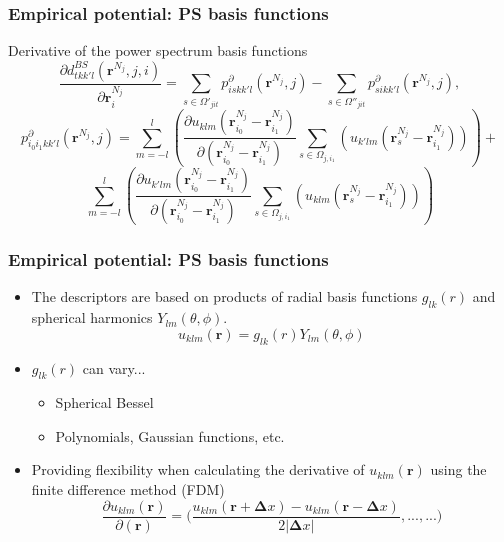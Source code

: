 \documentclass[10pt]{beamer}
\theoremstyle{remark}
\theoremstyle{definition}
\begin{document}
 


\begin{frame}
\frametitle{Empirical potential: PS basis functions}

Derivative of the power spectrum basis functions
\begin{equation*}
    \label{eq:derd}
    \frac{\partial d^{BS}_{tkk'l}(\bm r^{N_j}, j, i)}{\partial \bm r^{N_j}_i} = \sum_{s \in \Omega'_{jit}} p_{iskk'l}^{\partial}(\bm r^{N_j}, j) - \sum_{s \in \Omega''_{jit}} p_{sikk'l}^{\partial} ( \bm r^{N_j}, j),
\end{equation*}
\begin{equation*}
    p_{i_0i_1kk'l}^{\partial}(\bm r^{N_j}, j) = \sum_{m=-l}^l \left( \frac{\partial u_{klm}(\bm r_{i_0}^{N_j}- \bm r_{i_1}^{N_j})}{\partial (\bm r_{i_0}^{N_j}-\bm r_{i_1}^{N_j})} \sum_{s \in \Omega_{j,i_1}} \left( u_{k'lm} (\bm r^{N_j}_s- \bm r^{N_j}_{i_1}) \right) \right) + 
\end{equation*}
\begin{equation*}
\sum_{m=-l}^l \left( \frac{\partial u_{k'lm}(\bm r_{i_0}^{N_j}- \bm r_{i_1}^{N_j})}{\partial (\bm r_{i_0}^{N_j}- \bm r_{i_1}^{N_j})} \sum_{s \in \Omega_{j,i_1}} \left( u_{klm} (\bm r^{N_j}_s- \bm r^{N_j}_{i_1}) \right) \right)
\end{equation*}


\end{frame}
 
 

\begin{frame}
\frametitle{Empirical potential: PS basis functions}

\begin{itemize}
\item The descriptors are based on products of radial basis functions $g_{lk}(r)$ and spherical harmonics $Y_{lm}(\theta,\phi)$.
\begin{equation*}
u_{klm}(\bm r) =  g_{lk}(r) Y_{lm}(\theta,\phi)
\end{equation*}
\pause
\item $g_{lk}(r)$ can vary...
\begin{itemize}
    \item Spherical Bessel
    \item Polynomials, Gaussian functions, etc.
\end{itemize}
\pause
\item Providing flexibility when calculating the derivative of $u_{klm}(\bm r)$ using the finite difference method (FDM)
\begin{equation*}
     \frac{\partial u_{klm}(\bm r)}{\partial (\bm r)} =  
        \bigg( \frac{ u_{klm}(\bm r + \bm \Delta x) - u_{klm}(\bm r - \bm \Delta x) } {2 |\bm \Delta x|}, ..., ... \bigg)
\end{equation*}
\end{itemize}


\end{frame} 
 
\end{document}

